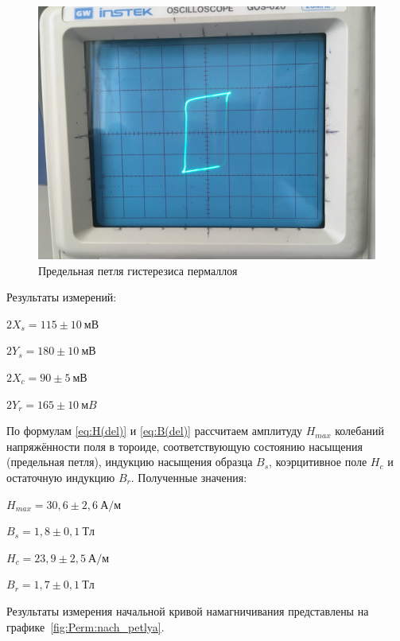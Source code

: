 \documentclass[a4paper, 12pt]{article}
\begin{document}
\begin{figure}[h!]
\begin{center}
    \includegraphics[scale=0.07]{perm.jpg}
\end{center}
\caption{Предельная петля гистерезиса пермаллоя}
\label{fig:Perm:petlya}
\end{figure}

Результаты измерений:
\begin{description}
\item{} $2X_s = 115\pm10~мВ$
\item{} $2Y_s = 180\pm10~мВ$
\item{} $2X_c = 90\pm5~мВ$
\item{} $2Y_r = 165\pm10~мB$
\end{description}

По формулам \eqref{eq:H(del)} и \eqref{eq:B(del)} рассчитаем амплитуду $H_{max}$ колебаний напряжённости поля в тороиде, соответствующую состоянию насыщения (предельная петля), индукцию насыщения образца $B_s$, коэрцитивное поле $H_c$ и остаточную индукцию $B_r$. Полученные значения:
\begin{description}
\item{} $H_{max} = 30,6\pm2,6~А/м$
\item{} $B_s = 1,8\pm0,1~Тл$
\item{} $H_c = 23,9\pm2,5~А/м$
\item{} $B_r = 1,7\pm0,1~Тл$
\end{description}

Результаты измерения начальной кривой намагничивания представлены на графике~\ref{fig:Perm:nach_petlya}.
\end{document}
